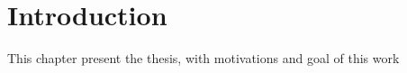 \documentclass[pdftex,12pt,a4paper]{report}
\begin{document}


\chapter{Introduction}
This chapter present the thesis, with motivations and goal of this work
%
\end{document}
